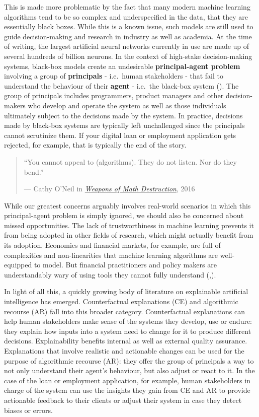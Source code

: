 \documentclass{juliacon}
\begin{document}
This is made more problematic by the fact that many modern machine
learning algorithms tend to be so complex and underspecified in the
data, that they are essentially black boxes. While this is a known
issue, such models are still used to guide decision-making and research
in industry as well as academia. At the time of writing, the largest
artificial neural networks currently in use are made up of several
hundreds of billion neurons. In the context of high-stake
decision-making systems, black-box models create an undesirable
\textbf{principal-agent problem} involving a group of
\textbf{principals} - i.e.~human stakeholders - that fail to understand
the behaviour of their \textbf{agent} - i.e.~the black-box system
(\cite{borch2022machine}). The group of principals includes programmers,
product managers and other decision-makers who develop and operate the
system as well as those individuals ultimately subject to the decisions
made by the system. In practice, decisions made by black-box systems are
typically left unchallenged since the principals cannot scrutinize them.
If your digital loan or employment application gets rejected, for
example, that is typically the end of the story.

\begin{quote}
``You cannot appeal to (algorithms). They do not listen. Nor do they
bend.''

--- Cathy O'Neil in
\href{https://en.wikipedia.org/wiki/Weapons_of_Math_Destruction}{\emph{Weapons
of Math Destruction}}, 2016
\end{quote}

While our greatest concerns arguably involves real-world scenarios in
which this principal-agent problem is simply ignored, we should also be
concerned about missed opportunities. The lack of trustworthiness in
machine learning prevents it from being adopted in other fields of
research, which might actually benefit from its adoption. Economics and
financial markets, for example, are full of complexities and
non-linearities that machine learning algorithms are well-equipped to
model. But financial practitioners and policy makers are understandably
wary of using tools they cannot fully understand
(\cite{oecd2021artificial},\cite{hansen2020virtue}).

In light of all this, a quickly growing body of literature on
explainable artificial intelligence has emerged. Counterfactual
explanations (CE) and algorithmic recourse (AR) fall into this broader
category. Counterfactual explanations can help human stakeholders make
sense of the systems they develop, use or endure: they explain how
inputs into a system need to change for it to produce different
decisions. Explainability benefits internal as well as external quality
assurance. Explanations that involve realistic and actionable changes
can be used for the purpose of algorithmic recourse (AR): they offer the
group of principals a way to not only understand their agent's
behaviour, but also adjust or react to it. In the case of the loan or
employment application, for example, human stakeholders in charge of the
system can use the insights they gain from CE and AR to provide
actionable feedback to their clients or adjust their system in case they
detect biases or errors.
\end{document}
